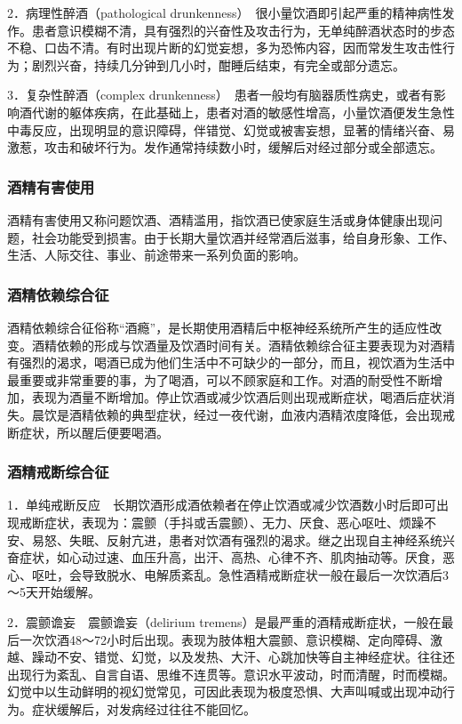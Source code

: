 2．病理性醉酒（pathological
drunkenness）　很小量饮酒即引起严重的精神病性发作。患者意识模糊不清，具有强烈的兴奋性及攻击行为，无单纯醉酒状态时的步态不稳、口齿不清。有时出现片断的幻觉妄想，多为恐怖内容，因而常发生攻击性行为；剧烈兴奋，持续几分钟到几小时，酣睡后结束，有完全或部分遗忘。

3．复杂性醉酒（complex
drunkenness）　患者一般均有脑器质性病史，或者有影响酒代谢的躯体疾病，在此基础上，患者对酒的敏感性增高，小量饮酒便发生急性中毒反应，出现明显的意识障碍，伴错觉、幻觉或被害妄想，显著的情绪兴奋、易激惹，攻击和破坏行为。发作通常持续数小时，缓解后对经过部分或全部遗忘。

\subsubsection{酒精有害使用}

酒精有害使用又称问题饮酒、酒精滥用，指饮酒已使家庭生活或身体健康出现问题，社会功能受到损害。由于长期大量饮酒并经常酒后滋事，给自身形象、工作、生活、人际交往、事业、前途带来一系列负面的影响。

\subsubsection{酒精依赖综合征}

酒精依赖综合征俗称“酒瘾”，是长期使用酒精后中枢神经系统所产生的适应性改变。酒精依赖的形成与饮酒量及饮酒时间有关。酒精依赖综合征主要表现为对酒精有强烈的渴求，喝酒已成为他们生活中不可缺少的一部分，而且，视饮酒为生活中最重要或非常重要的事，为了喝酒，可以不顾家庭和工作。对酒的耐受性不断增加，表现为酒量不断增加。停止饮酒或减少饮酒后则出现戒断症状，喝酒后症状消失。晨饮是酒精依赖的典型症状，经过一夜代谢，血液内酒精浓度降低，会出现戒断症状，所以醒后便要喝酒。

\subsubsection{酒精戒断综合征}

1．单纯戒断反应　长期饮酒形成酒依赖者在停止饮酒或减少饮酒数小时后即可出现戒断症状，表现为：震颤（手抖或舌震颤）、无力、厌食、恶心呕吐、烦躁不安、易怒、失眠、反射亢进，患者对饮酒有强烈的渴求。继之出现自主神经系统兴奋症状，如心动过速、血压升高，出汗、高热、心律不齐、肌肉抽动等。厌食，恶心、呕吐，会导致脱水、电解质紊乱。急性酒精戒断症状一般在最后一次饮酒后3～5天开始缓解。

2．震颤谵妄　震颤谵妄（delirium
tremens）是最严重的酒精戒断症状，一般在最后一次饮酒48～72小时后出现。表现为肢体粗大震颤、意识模糊、定向障碍、激越、躁动不安、错觉、幻觉，以及发热、大汗、心跳加快等自主神经症状。往往还出现行为紊乱、自言自语、思维不连贯等。意识水平波动，时而清醒，时而模糊。幻觉中以生动鲜明的视幻觉常见，可因此表现为极度恐惧、大声叫喊或出现冲动行为。症状缓解后，对发病经过往往不能回忆。

